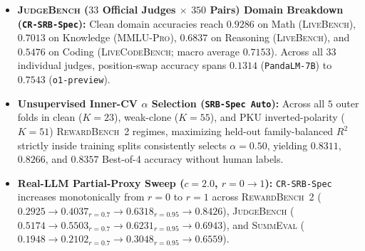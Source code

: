 \begin{itemize}[leftmargin=*,itemsep=2pt]
\item \textbf{\textsc{JudgeBench} ($33$ Official Judges $\times$ $350$ Pairs) Domain Breakdown (\texttt{CR-SRB-Spec}):} Clean domain accuracies reach $0.9286$ on Math (\textsc{LiveBench}), $0.7013$ on Knowledge (\textsc{MMLU-Pro}), $0.6837$ on Reasoning (\textsc{LiveBench}), and $0.5476$ on Coding (\textsc{LiveCodeBench}; macro average $0.7153$). Across all $33$ individual judges, position-swap accuracy spans $0.1314$ (\texttt{PandaLM-7B}) to $0.7543$ (\texttt{o1-preview}).
\item \textbf{Unsupervised Inner-CV $\alpha$ Selection (\texttt{SRB-Spec Auto}):} Across all $5$ outer folds in clean ($K=23$), weak-clone ($K=55$), and PKU inverted-polarity ($K=51$) \textsc{RewardBench~2} regimes, maximizing held-out family-balanced $R^2$ strictly inside training splits consistently selects $\alpha = 0.50$, yielding $0.8311$, $0.8266$, and $0.8357$ Best-of-4 accuracy without human labels.
\item \textbf{Real-LLM Partial-Proxy Sweep ($c=2.0$, $r = 0 \to 1$):} \texttt{CR-SRB-Spec} increases monotonically from $r=0$ to $r=1$ across \textsc{RewardBench~2} ($0.2925 \to 0.4037_{r=0.7} \to 0.6318_{r=0.95} \to 0.8426$), \textsc{JudgeBench} ($0.5174 \to 0.5503_{r=0.7} \to 0.6231_{r=0.95} \to 0.6943$), and \textsc{SummEval} ($0.1948 \to 0.2102_{r=0.7} \to 0.3048_{r=0.95} \to 0.6559$).
\end{itemize}
